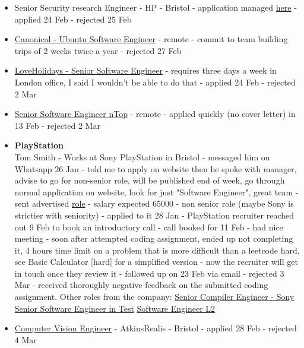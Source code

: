 \begin{itemize}
\item Senior Security research Engineer - HP - Bristol - application managed
    \href{https://hpe.wd5.myworkdayjobs.com/en-US/wfmathpe/userHome}{here} -
    applied 24 Feb - rejected 25 Feb
\item
    \href{https://job-boards.greenhouse.io/canonical/jobs/6707824}{Canonical -
    Ubuntu Software Engineer} - remote - commit to team building trips of 2
    weeks twice a year - rejected 27 Feb
\item
    \href{https://jobs.ashbyhq.com/loveholidays/9fa22c66-4ebd-4e59-955b-09198e8fe3c2/application}{LoveHolidays
    - Senior Software Engineer} - requires three days a week in London office, I
    said I wouldn't be able to do that - applied 24 Feb - rejected 2 Mar
\item 
  \href{https://jobs.gem.com/ntop/am9icG9zdDqwOzqEyqs3X59TogF_iDLV}{Senior
    Software Engineer nTop} - remote - applied quickly (no cover letter) in 13
    Feb - rejected 2 Mar
\item
  \textbf{PlayStation}\\
    Tom Smith - Works at Sony PlayStation in Bristol - messaged him on
    Whatsapp 26 Jan - told me to apply on website then he spoke with manager,
    advise to go for non-senior role, will be published end of week, go through
    normal application on website, look for just "Software Engineer", great team
    - sent advertised
    \href{https://job-boards.greenhouse.io/sonyinteractiveentertainmentglobal/jobs/5777504004}{role}
    - salary expected 65000 - non senior role (maybe Sony is strictier with seniority) 
    - applied to it 28 Jan - PlayStation recruiter reached out 9 Feb to book an introductory call
    - call booked for 11 Feb - had nice meeting - soon after attempted coding assignment,
    ended up not completing it, 4 hours time limit on a problem that is more
    difficult than a leetcode hard, see Basic Calculator [hard] for a simplified
    version - now the recruiter will get in touch once they review it - followed
    up on 23 Feb via email - rejected 3 Mar - received thoroughly negative feedback on
    the submitted coding assignment. 
    Other roles from the company:
    \href{https://careers.playstation.com/senior-compiler-engineer/job/5727097004}
    {Senior Compiler Engineer - Sony}
    \href{https://careers.playstation.com/fr-ca/senior-software-engineer-in-test/job/5738165004?utm_campaign=google_jobs_apply&utm_source=google_jobs_apply&utm_medium=organic}
    {Senior Software Engineer in Test}
    \href{https://job-boards.greenhouse.io/sonyinteractiveentertainmentglobal/jobs/5777504004}
    {Software Engineer L2}

  \item
    \href{https://careers.atkinsrealis.com/en/jobs/computer-vision-engineer-r-149659?section=job-overview}{Computer
    Vision Engineer} - AtkinsRealis - Bristol - applied 28 Feb - rejected 4 Mar
\end{itemize}

